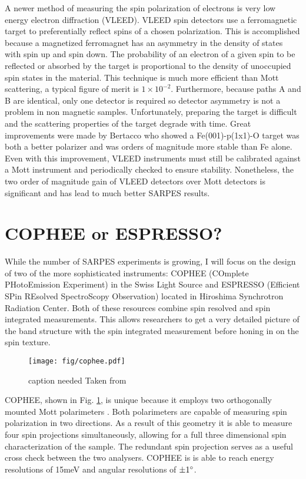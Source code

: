 \documentclass[12pt]{article}
\begin{document}
A newer method of measuring the spin polarization of electrons is very low energy electron diffraction (VLEED).
VLEED spin detectors use a ferromagnetic target to preferentially reflect spins of a chosen polarization.
This is accomplished because a magnetized ferromagnet has an asymmetry in the density of states with spin up and spin down.
The probability of an electron of a given spin to be reflected or absorbed by the target is proportional to the density of unoccupied spin states in the material\cite{Okuda-Kimura}.
This technique is much more efficient than Mott scattering, a typical figure of merit is $1\times10^{-2}$.
Furthermore, because paths A and B are identical, only one detector is required so detector asymmetry is not a problem in non magnetic samples.
Unfortunately, preparing the target is difficult and the scattering properties of the target degrade with time.
Great improvements were made by Bertacco \cite{Bertacco} who showed a Fe(001)-p(1x1)-O target was both a better polarizer and was orders of magnitude more stable than Fe alone.
Even with this improvement, VLEED instruments must still be calibrated against a Mott instrument and periodically checked to ensure stability.
Nonetheless, the two order of magnitude gain of VLEED detectors over Mott detectors is significant and has lead to much better SARPES results.
\section{COPHEE or ESPRESSO?}
While the number of SARPES experiments is growing, I will focus on the design of two of the more sophisticated instruments:  COPHEE (COmplete PHotoEmission Experiment) in the Swiss Light Source and ESPRESSO (Efficient SPin REsolved SpectroScopy Observation) located in Hiroshima Synchrotron Radiation Center.
Both of these resources combine spin resolved and spin integrated measurements.
This allows researchers to get a very detailed picture of the band structure with the spin integrated measurement before honing in on the spin texture.

\begin{figure}[h]
  \centering
  \texttt{[image: fig/cophee.pdf]}
  \caption[should I put this here?]
  {caption needed Taken from \cite{Hoesch}}
  \label{fig:cophee}
\end{figure}
COPHEE, shown in Fig. \ref{fig:cophee}, is unique because it employs two orthogonally mounted Mott polarimeters \cite{Hoesch}.
Both polarimeters are capable of measuring spin polarization in two directions.
As a result of this geometry it is able to measure four spin projections simultaneously, allowing for a full three dimensional spin characterization of the sample.
The redundant spin projection serves as a useful cross check between the two analysers.
COPHEE is is able to reach energy resolutions of 15meV and angular resolutions of $\pm1\degree$.
\end{document}
